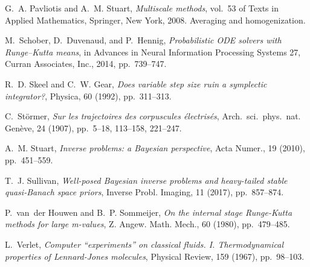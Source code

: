 \documentclass[10pt]{article}
\begin{document}
\begin{thebibliography}{10}
	{\sc G.~A. Pavliotis and A.~M. Stuart}, {\em Multiscale methods}, vol.~53 of
	Texts in Applied Mathematics, Springer, New York, 2008.
	\newblock Averaging and homogenization.
	
	{\sc M.~Schober, D.~Duvenaud, and P.~Hennig}, {\em Probabilistic {ODE} solvers
		with {R}unge--{K}utta means}, in Advances in Neural Information Processing
	Systems 27, Curran Associates, Inc., 2014, pp.~739--747.
	
	{\sc R.~D. Skeel and C.~W. Gear}, {\em Does variable step size ruin a
		symplectic integrator?}, Physica, 60 (1992), pp.~311--313.
	
	{\sc C.~St\"ormer}, {\em Sur les trajectoires des corpuscules \'electris\'es},
	Arch.\ sci.\ phys.\ nat. Gen\`eve, 24 (1907), pp.~5--18, 113--158, 221--247.
	
	{\sc A.~M. Stuart}, {\em Inverse problems: a {B}ayesian perspective}, Acta
	Numer., 19 (2010), pp.~451--559.
	
	{\sc T.~J. Sullivan}, {\em Well-posed {B}ayesian inverse problems and
		heavy-tailed stable quasi-{B}anach space priors}, Inverse Probl. Imaging, 11
	(2017), pp.~857--874.
	
	{\sc P.~van~der Houwen and B.~P. Sommeijer}, {\em On the internal stage
		{R}unge-{K}utta methods for large m-values}, Z. Angew. Math. Mech., 60
	(1980), pp.~479--485.
	
	{\sc L.~Verlet}, {\em Computer ``experiments'' on classical fluids. {I}.
		{T}hermodynamical properties of {L}ennard-{J}ones molecules}, Physical
	Review, 159 (1967), pp.~98--103.
	
\end{thebibliography}
\end{document}
